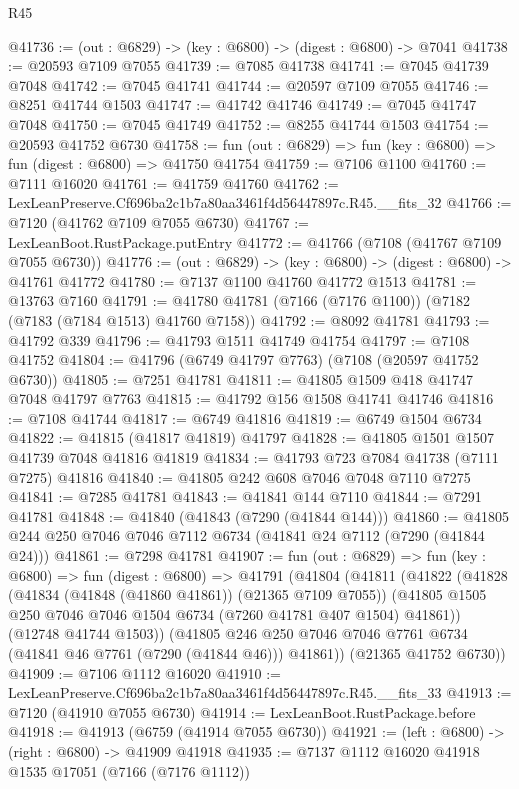 \begin{lexlean}{R45}
\begin{coremodule}
{@41736 := (out : @6829) -> (key : @6800) -> (digest : @6800) -> @7041
@41738 := @20593 @7109 @7055
@41739 := @7085 @41738
@41741 := @7045 @41739 @7048
@41742 := @7045 @41741
@41744 := @20597 @7109 @7055
@41746 := @8251 @41744 @1503
@41747 := @41742 @41746
@41749 := @7045 @41747 @7048
@41750 := @7045 @41749
@41752 := @8255 @41744 @1503
@41754 := @20593 @41752 @6730
@41758 := fun (out : @6829) => fun (key : @6800) => fun (digest : @6800) => @41750 @41754
@41759 := @7106 @1100
@41760 := @7111 @16020
@41761 := @41759 @41760
@41762 := LexLeanPreserve.Cf696ba2c1b7a80aa3461f4d56447897c.R45.__fits_32
@41766 := @7120 (@41762 @7109 @7055 @6730)
@41767 := LexLeanBoot.RustPackage.putEntry
@41772 := @41766 (@7108 (@41767 @7109 @7055 @6730))
@41776 := (out : @6829) -> (key : @6800) -> (digest : @6800) -> @41761 @41772
@41780 := @7137 @1100 @41760 @41772 @1513
@41781 := @13763 @7160
@41791 := @41780 @41781 (@7166 (@7176 @1100)) (@7182 (@7183 (@7184 @1513) @41760 @7158))
@41792 := @8092 @41781
@41793 := @41792 @339
@41796 := @41793 @1511 @41749 @41754
@41797 := @7108 @41752
@41804 := @41796 (@6749 @41797 @7763) (@7108 (@20597 @41752 @6730))
@41805 := @7251 @41781
@41811 := @41805 @1509 @418 @41747 @7048 @41797 @7763
@41815 := @41792 @156 @1508 @41741 @41746
@41816 := @7108 @41744
@41817 := @6749 @41816
@41819 := @6749 @1504 @6734
@41822 := @41815 (@41817 @41819) @41797
@41828 := @41805 @1501 @1507 @41739 @7048 @41816 @41819
@41834 := @41793 @723 @7084 @41738 (@7111 @7275) @41816
@41840 := @41805 @242 @608 @7046 @7048 @7110 @7275
@41841 := @7285 @41781
@41843 := @41841 @144 @7110
@41844 := @7291 @41781
@41848 := @41840 (@41843 (@7290 (@41844 @144)))
@41860 := @41805 @244 @250 @7046 @7046 @7112 @6734 (@41841 @24 @7112 (@7290 (@41844 @24)))
@41861 := @7298 @41781
@41907 := fun (out : @6829) =>
  fun (key : @6800) =>
  fun (digest : @6800) =>
  @41791
    (@41804
      (@41811
        (@41822
          (@41828
            (@41834 (@41848 (@41860 @41861)) (@21365 @7109 @7055))
            (@41805 @1505 @250 @7046 @7046 @1504 @6734 (@7260 @41781 @407 @1504) @41861))
          (@12748 @41744 @1503))
        (@41805 @246 @250 @7046 @7046 @7761 @6734 (@41841 @46 @7761 (@7290 (@41844 @46))) @41861))
      (@21365 @41752 @6730))
@41909 := @7106 @1112 @16020
@41910 := LexLeanPreserve.Cf696ba2c1b7a80aa3461f4d56447897c.R45.__fits_33
@41913 := @7120 (@41910 @7055 @6730)
@41914 := LexLeanBoot.RustPackage.before
@41918 := @41913 (@6759 (@41914 @7055 @6730))
@41921 := (left : @6800) -> (right : @6800) -> @41909 @41918
@41935 := @7137
    @1112
    @16020
    @41918
    @1535
    @17051
    (@7166 (@7176 @1112))
}
\end{coremodule}
\end{lexlean}
